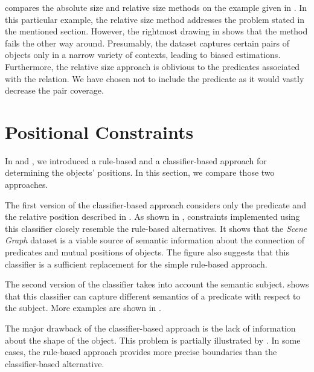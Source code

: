  compares the absolute size and relative size methods on the example given in . In this particular example, the relative size method addresses the problem stated in the mentioned section. However, the rightmost drawing in  shows that the method fails the other way around. Presumably, the dataset captures certain pairs of objects only in a narrow variety of contexts, leading to biased estimations. Furthermore, the relative size approach is oblivious to the predicates associated with the relation. We have chosen not to include the predicate as it would vastly decrease the pair coverage.

\section{Positional Constraints}
\label{sec:constraint_results}

In  and , we introduced a rule-based and a classifier-based approach for determining the objects' positions. In this section, we compare those two approaches.

\medskip

The first version of the classifier-based approach considers only the predicate and the relative position described in . As shown in , constraints implemented using this classifier closely resemble the rule-based alternatives. It shows that the \emph{Scene Graph} \citep{xu2017scenegraph} dataset is a viable source of semantic information about the connection of predicates and mutual positions of objects. The figure also suggests that this classifier is a sufficient replacement for the simple rule-based approach.

\medskip

The second version of the classifier takes into account the semantic subject.  shows that this classifier can capture different semantics of a predicate with respect to the subject. More examples are shown in . 

\medskip

The major drawback of the classifier-based approach is the lack of information about the shape of the object. This problem is partially illustrated by . In some cases, the rule-based approach provides more precise boundaries than the classifier-based alternative.

